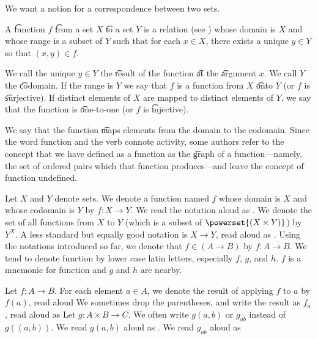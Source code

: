 

We want a notion for a correspondence between two sets.


A \t{function} $f$ \t{from} a set $X$ \t{to} a set $Y$ is a relation (see ) whose domain is $X$ and whose range is a subset of $Y$ such that for each $x \in X$, there exists a unique $y \in Y$ so that $(x, y) \in f$.

We call the unique $y \in Y$ the \t{result} of the function \t{at} the \t{argument} $x$.
We call $Y$ the \t{codomain}.
If the range is $Y$ we say that $f$ is a function from $X$ \t{onto} $Y$ (or $f$ is \t{surjective}).
If distinct elements of $X$ are mapped to distinct elements of $Y$, we say that the function is \t{one-to-one} (or $f$ is \t{injective}).

We say that the function \t{maps} elements from the domain to the codomain.
Since the word function and the verb  connote activity, some authors refer to the concept that we have defined as a function as the \t{graph} of a function---namely, the set of ordered pairs which that function produces---and leave the concept of function undefined.


Let $X$ and $Y$ denote sets.
We denote a function named $f$ whose domain is $X$ and whose codomain is $Y$ by $f: X \to Y$.
We read the notation aloud as .
We denote the set of all functions from $X$ to $Y$ (which is a subset of $\powerset{(X \times Y)}$) by $Y^{X}$.
A less standard but equally good notation is $X \to Y$, read aloud as .
Using the notations introduced so far, we denote that $f \in (A \to B)$ by $f: A \to B$.
We tend to denote function by lower case latin letters, especially $f$, $g$, and $h$.
$f$ is a mnemonic for function and $g$ and $h$ are nearby.

Let $f: A \to B$.
For each element $a \in A$, we denote the result of applying $f$ to $a$ by $f(a)$, read aloud 
We sometimes drop the parentheses, and write the result as $f_a$, read aloud as 
Let $g: A \times B \to C$.
We often write $g(a,b)$ or $g_{ab}$ instead of $g((a,b))$.
We read $g(a, b)$ aloud as .
We read $g_{ab}$ aloud as 

